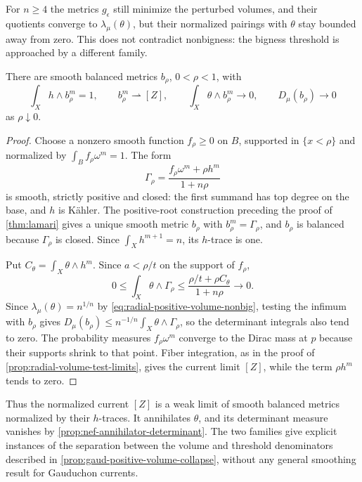 For $n\geq4$ the metrics $g_\epsilon$ still minimize the perturbed volumes, and their quotients converge to $\lambda_\mu(\theta)$, but their normalized pairings with $\theta$ stay bounded away from zero. This does not contradict nonbigness: the bigness threshold is approached by a different family.

\begin{proposition}\label{prop:radial-localized-balanced-tests}
There are smooth balanced metrics $b_\rho$, $0<\rho<1$, with
\[
 \int_Xh\wedge b_\rho^m=1,\qquad
 b_\rho^m\rightharpoonup[Z],\qquad
 \int_X\theta\wedge b_\rho^m\longrightarrow0,
 \qquad D_\mu(b_\rho)\longrightarrow0
\]
as $\rho\downarrow0$.
\end{proposition}
\begin{proof}
Choose a nonzero smooth function $f_\rho\geq0$ on $B$, supported in $\{x<\rho\}$ and normalized by $\int_Bf_\rho\omega^m=1$. The form
\begin{equation}\label{eq:radial-localized-test-form}
 \Gamma_\rho=\frac{f_\rho\omega^m+\rho h^m}{1+n\rho}
\end{equation}
is smooth, strictly positive and closed: the first summand has top degree on the base, and $h$ is K\"ahler. The positive-root construction preceding the proof of \cref{thm:lamari} gives a unique smooth metric $b_\rho$ with $b_\rho^m=\Gamma_\rho$, and $b_\rho$ is balanced because $\Gamma_\rho$ is closed. Since $\int_Xh^{m+1}=n$, its $h$-trace is one.

Put $C_\theta=\int_X\theta\wedge h^m$. Since $a<\rho/t$ on the support of $f_\rho$,
\[
 0\leq\int_X\theta\wedge\Gamma_\rho
 \leq\frac{\rho/t+\rho C_\theta}{1+n\rho}\longrightarrow0.
\]
Since $\lambda_\mu(\theta)=n^{1/n}$ by \eqref{eq:radial-positive-volume-nonbig}, testing the infimum with $b_\rho$ gives
$D_\mu(b_\rho)\leq n^{-1/n}\int_X\theta\wedge\Gamma_\rho$, so the determinant integrals also tend to zero. The probability measures $f_\rho\omega^m$ converge to the Dirac mass at $p$ because their supports shrink to that point. Fiber integration, as in the proof of \cref{prop:radial-volume-test-limits}, gives the current limit $[Z]$, while the term $\rho h^m$ tends to zero.
\end{proof}

Thus the normalized current $[Z]$ is a weak limit of smooth balanced metrics normalized by their $h$-traces. It annihilates $\theta$, and its determinant measure vanishes by \cref{prop:nef-annihilator-determinant}. The two families give explicit instances of the separation between the volume and threshold denominators described in \cref{prop:gaud-positive-volume-collapse}, without any general smoothing result for Gauduchon currents.
